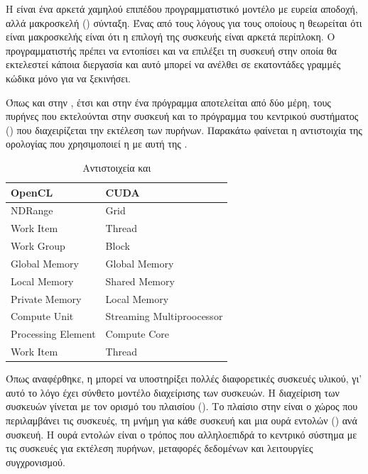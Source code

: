 Η  είναι ένα αρκετά χαμηλού επιπέδου προγραμματιστικό μοντέλο με ευρεία αποδοχή, αλλά μακροσκελή () σύνταξη. Ένας από τους λόγους για τους οποίους η  θεωρείται ότι είναι μακροσκελής είναι ότι η επιλογή της συσκευής είναι αρκετά περίπλοκη. Ο προγραμματιστής πρέπει να εντοπίσει και να επιλέξει τη συσκευή στην οποία θα εκτελεστεί κάποια διεργασία και αυτό μπορεί να ανέλθει σε εκατοντάδες γραμμές κώδικα μόνο για να ξεκινήσει. 

Όπως και στην  , έτσι και στην  ένα πρόγραμμα αποτελείται από δύο μέρη, τους πυρήνες που εκτελούνται στην συσκευή και το πρόγραμμα του κεντρικού συστήματος () που διαχειρίζεται την εκτέλεση των πυρήνων. Παρακάτω φαίνεται η αντιστοιχία της ορολογίας που χρησιμοποιεί η  με αυτή της .


\begin{table}[!h]
    \centering
    \begin{tabular}{ll}
        \textbf{OpenCL} & \textbf{CUDA} \\
        \hline
        NDRange & Grid \\
        Work Item & Thread \\
        Work Group & Block \\
        \hline
        Global Memory & Global Memory \\
        Local Memory & Shared Memory \\
        Private Memory & Local Memory \\
        Compute Unit & Streaming Multiproocessor \\
        Processing Element & Compute Core \\
        Work Item & Thread \\
        \hline
    \end{tabular}
    \caption{Αντιστοιχεία  και }
    \label{tab:opencl-cuda}
\end{table}


Όπως αναφέρθηκε, η  μπορεί να υποστηρίξει πολλές διαφορετικές συσκευές υλικού, γι’ αυτό το λόγο έχει σύνθετο μοντέλο διαχείρισης των συσκευών. Η διαχείριση των συσκευών γίνεται με τον ορισμό του πλαισίου (). Το πλαίσιο στην  είναι ο χώρος που περιλαμβάνει τις συσκευές, τη μνήμη για κάθε συσκευή και μια ουρά εντολών () ανά συσκευή. H ουρά εντολών είναι ο τρόπος που αλληλοεπιδρά το κεντρικό σύστημα με τις συσκευές για εκτέλεση πυρήνων, μεταφορές δεδομένων και λειτουργίες συγχρονισμού.
 
